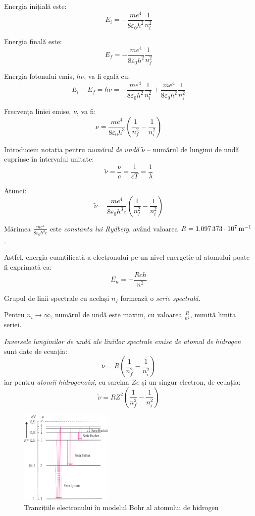 Energia inițială este:
\[ E_i = -\frac{me^4}{8\varepsilon_0 h^2} \frac{1}{n_i^2} \]

Energia finală este:
\[ E_f = -\frac{me^4}{8\varepsilon_0 h^2} \frac{1}{n_f^2} \]

Energia fotonului emis, $h\nu$, va fi egală cu:
\[
    E_i - E_f = h\nu
    = -\frac{me^4}{8\varepsilon_0 h^2} \frac{1}{n_i^2}
    + \frac{me^4}{8\varepsilon_0 h^2} \frac{1}{n_f^2}
\]

Frecvența liniei emise, $\nu$, va fi:
\[
    \nu = \frac{me^4}{8\varepsilon_0 h^3}
    \left(\frac{1}{n_f^2} - \frac{1}{n_i^2}\right)
\]

Introducem notația pentru \emph{numărul de undă} $\tilde{\nu}$ -- numărul de
lungimi de undă cuprinse în intervalul unitate:
\[ \tilde{\nu} = \frac{\nu}{c} = \frac{1}{cT} = \frac{1}{\lambda} \]

Atunci:
\[
    \tilde{\nu} = \frac{me^4}{8\varepsilon_0 h^3c}
    \left(\frac{1}{n_f^2} - \frac{1}{n_i^2}\right)
\]

Mărimea $\frac{me^4}{8\varepsilon_0 h^3c}$ este \emph{constanta lui Rydberg},
având valoarea $R = \SI{1,097373d7}{\per\meter}$.

Astfel, energia cuantificată a electronului pe un nivel energetic al atomului
poate fi exprimată ca:
\[ \boxed{E_n = -\frac{Rch}{n^2}} \]

Grupul de linii spectrale cu același $n_f$ formează o \emph{serie spectrală}.

Pentru $n_i \rightarrow \infty$, numărul de undă este maxim, cu valoarea
$\frac{R}{n^2}$, numită limita seriei.

\emph{Inversele lungimilor de undă ale liniilor spectrale emise de atomul de
hidrogen} sunt date de ecuația:
\[ \tilde{\nu} = R \left(\frac{1}{n_f^2} - \frac{1}{n_i^2}\right) \]
iar pentru \emph{atomii hidrogenoizi}, cu sarcina $Ze$ și un singur electron,
de ecuația:
\[ \tilde{\nu} = RZ^2 \left(\frac{1}{n_f^2} - \frac{1}{n_i^2}\right) \]

\clearpage

\begin{figure}
    \centering
    \includegraphics[width=0.4\textwidth]{fig/tranzitii_electron}
    \caption{Tranzițiile electronului în modelul Bohr al atomului de hidrogen}
\end{figure}

